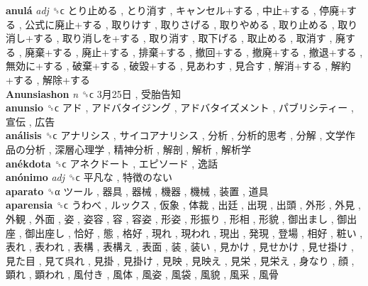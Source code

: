 \textbf{anulá} \emph{adj}  ␝ϲ   とり止める ,  とり消す ,  キャンセル+する ,  中止+する ,  停廃+する ,  公式に廃止+する ,  取りけす ,  取りさげる ,  取りやめる ,  取り止める ,  取り消し+する ,  取り消しを+する ,  取り消す ,  取下げる ,  取止める ,  取消す ,  廃する ,  廃棄+する ,  廃止+する ,  排棄+する ,  撤回+する ,  撤廃+する ,  撤退+する ,  無効に+する ,  破棄+する ,  破毀+する ,  見あわす ,  見合す ,  解消+する ,  解約+する ,  解除+する   \\
\textbf{Anunsiashon} \emph{n}  ␝ϲ   3月25日 ,  受胎告知   \\
\textbf{anunsio} ␝ϲ   アド ,  アドバタイジング ,  アドバタイズメント ,  パブリシティー ,  宣伝 ,  広告   \\
\textbf{análisis} ␝ϲ   アナリシス ,  サイコアナリシス ,  分析 ,  分析的思考 ,  分解 ,  文学作品の分析 ,  深層心理学 ,  精神分析 ,  解剖 ,  解析 ,  解析学   \\
\textbf{anékdota} ␝ϲ   アネクドート ,  エピソード ,  逸話   \\
\textbf{anónimo} \emph{adj}  ␝ϲ   平凡な ,  特徴のない   \\
\textbf{aparato} ␝α   ツール ,  器具 ,  器械 ,  機器 ,  機械 ,  装置 ,  道具   \\
\textbf{aparensia} ␝ϲ   うわべ ,  ルックス ,  仮象 ,  体裁 ,  出廷 ,  出現 ,  出頭 ,  外形 ,  外見 ,  外観 ,  外面 ,  姿 ,  姿容 ,  容 ,  容姿 ,  形姿 ,  形振り ,  形相 ,  形貌 ,  御出まし ,  御出座 ,  御出座し ,  恰好 ,  態 ,  格好 ,  現れ ,  現われ ,  現出 ,  発現 ,  登場 ,  相好 ,  粧い ,  表れ ,  表われ ,  表構 ,  表構え ,  表面 ,  装 ,  装い ,  見かけ ,  見せかけ ,  見せ掛け ,  見た目 ,  見て呉れ ,  見掛 ,  見掛け ,  見映 ,  見映え ,  見栄 ,  見栄え ,  身なり ,  顔 ,  顕れ ,  顕われ ,  風付き ,  風体 ,  風姿 ,  風袋 ,  風貌 ,  風采 ,  風骨   \\
